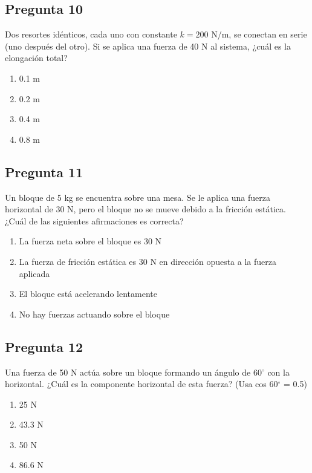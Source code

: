 \begin{preguntabox}
\subsection{Pregunta 10}
Dos resortes idénticos, cada uno con constante $k = 200$ N/m, se conectan en serie (uno después del otro). Si se aplica una fuerza de 40 N al sistema, ¿cuál es la elongación total?

\begin{enumerate}
    \item[A)] 0.1 m
    \item[B)] 0.2 m
    \item[C)] 0.4 m
    \item[D)] 0.8 m
\end{enumerate}
\end{preguntabox}

\begin{preguntabox}
\subsection{Pregunta 11}
Un bloque de 5 kg se encuentra sobre una mesa. Se le aplica una fuerza horizontal de 30 N, pero el bloque no se mueve debido a la fricción estática. ¿Cuál de las siguientes afirmaciones es correcta?

\begin{enumerate}
    \item[A)] La fuerza neta sobre el bloque es 30 N
    \item[B)] La fuerza de fricción estática es 30 N en dirección opuesta a la fuerza aplicada
    \item[C)] El bloque está acelerando lentamente
    \item[D)] No hay fuerzas actuando sobre el bloque
\end{enumerate}
\end{preguntabox}

\begin{preguntabox}
\subsection{Pregunta 12}
Una fuerza de 50 N actúa sobre un bloque formando un ángulo de 60$^\circ$ con la horizontal. ¿Cuál es la componente horizontal de esta fuerza? (Usa cos 60$^\circ$ = 0.5)

\begin{enumerate}
    \item[A)] 25 N
    \item[B)] 43.3 N
    \item[C)] 50 N
    \item[D)] 86.6 N
\end{enumerate}
\end{preguntabox}

